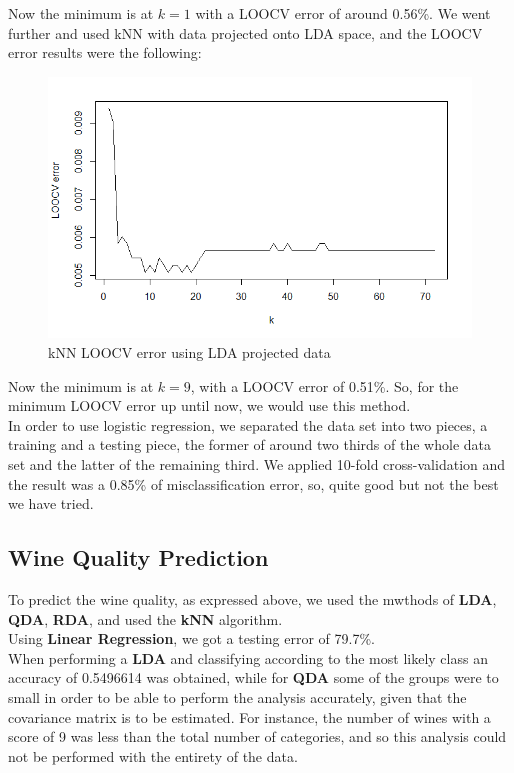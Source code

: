 \documentclass[10pt]{article}
\begin{document}
Now the minimum is at $k=1$ with a LOOCV error of around 0.56\%. We went further and used kNN with data projected onto LDA space, and the LOOCV error results were the following:
\begin{figure}[H]
\centering
\caption{kNN LOOCV error using LDA projected data}
\includegraphics[scale=0.5]{kNN_LDA_LOOCV_error}
\end{figure}
Now the minimum is at $k=9$, with a LOOCV error of 0.51\%. So, for the minimum LOOCV error up until now, we would use this method.\\

In order to use logistic regression, we separated the data set into two pieces, a training and a testing piece, the former of around two thirds of the whole data set and the latter of the remaining third. We applied 10-fold cross-validation and the result was a 0.85\% of misclassification error, so, quite good but not the best we have tried.
\subsection{Wine Quality Prediction}

To predict the wine quality, as expressed above, we used the mwthods of \textbf{LDA}, \textbf{QDA}, \textbf{RDA}, and used the \textbf{kNN} algorithm.\\

Using \textbf{Linear Regression}, we got a testing error of 79.7\%.\\

When performing a \textbf{LDA} and classifying according to the most likely class an accuracy of 0.5496614 was obtained, while for \textbf{QDA} some of the groups were to small in order to be able to perform the analysis accurately, given that the covariance matrix is to be estimated. For instance, the number of wines with a score of 9 was less than the total number of categories, and so this analysis could not be performed with the entirety of the data.\\
\end{document}
